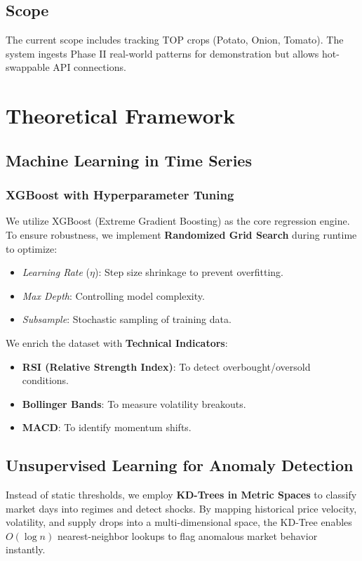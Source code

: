 \documentclass[a4paper,12pt]{report}
\begin{document}
\section{Scope}
The current scope includes tracking TOP crops (Potato, Onion, Tomato). The system ingests Phase II real-world patterns for demonstration but allows hot-swappable API connections.

\chapter{Theoretical Framework}

\section{Machine Learning in Time Series}
\subsection{XGBoost with Hyperparameter Tuning}
We utilize XGBoost (Extreme Gradient Boosting) as the core regression engine. To ensure robustness, we implement \textbf{Randomized Grid Search} during runtime to optimize:
\begin{itemize}
    \item \textit{Learning Rate} ($\eta$): Step size shrinkage to prevent overfitting.
    \item \textit{Max Depth}: Controlling model complexity.
    \item \textit{Subsample}: Stochastic sampling of training data.
\end{itemize}

We enrich the dataset with \textbf{Technical Indicators}:
\begin{itemize}
    \item \textbf{RSI (Relative Strength Index)}: To detect overbought/oversold conditions.
    \item \textbf{Bollinger Bands}: To measure volatility breakouts.
    \item \textbf{MACD}: To identify momentum shifts.
\end{itemize}

\section{Unsupervised Learning for Anomaly Detection}
Instead of static thresholds, we employ \textbf{KD-Trees in Metric Spaces} to classify market days into regimes and detect shocks. By mapping historical price velocity, volatility, and supply drops into a multi-dimensional space, the KD-Tree enables $O(\log n)$ nearest-neighbor lookups to flag anomalous market behavior instantly.
\end{document}
